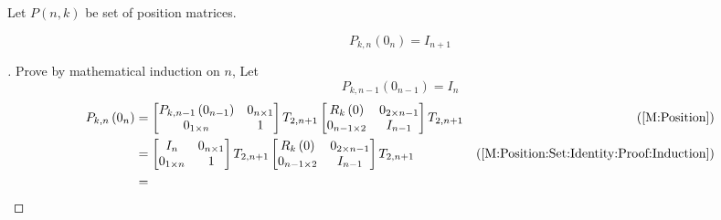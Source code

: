 \documentclass[../main.tex]{subfiles}
\begin{document}
\begin{definition}\label{M:Position:Set}
    Let $P\left(n,k\right)$ be set of position matrices.
\end{definition}
\begin{corollary}\label{M:Position:Set:Identity}
    \begin{equation*}
        P_{k,n}
        \left(0_{n}\right)
        =
        I_{n+1}
    \end{equation*}
\end{corollary}
\begin{proof}[]
    Prove by mathematical induction on $n$,
    Let
    \begin{equation}\label{M:Position:Set:Identity:Proof:Induction}
        P_{k,n-1}\left(0_{n-1}\right)=I_n
    \end{equation}
    \begin{align*}
        P_{k, n}\left(0_{n}\right)
                   & =
        \begin{bmatrix}
            P_{k,n-1}\left(0_{n-1}\right) & 0_{n\times 1} \\
            0_{1\times n}                 & 1             \\
        \end{bmatrix}
        T_{2, n+1}
        \begin{bmatrix}
            R_{k}\left(0\right) & 0_{{2}\times{n-1}} \\
            0_{{n-1}\times{2}}  & {I}_{n-1}          \\
        \end{bmatrix}
        T_{2, n+1} & \text{(\cref{M:Position})}                              \\
                   & =
        \begin{bmatrix}
            I_{n}         & 0_{n\times 1} \\
            0_{1\times n} & 1             \\
        \end{bmatrix}
        T_{2, n+1}
        \begin{bmatrix}
            R_{k}\left(0\right) & 0_{{2}\times{n-1}} \\
            0_{{n-1}\times{2}}  & {I}_{n-1}          \\
        \end{bmatrix}
        T_{2, n+1} & \text{(\cref{M:Position:Set:Identity:Proof:Induction})} \\
                   & =

\end{align*}
\end{proof}
\end{document}
